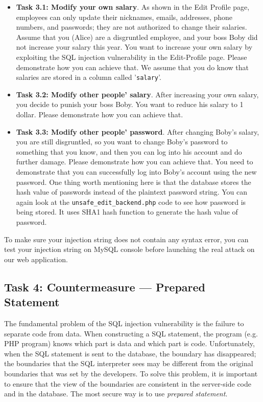 \begin{itemize}
\item {\bf Task 3.1: Modify your own salary}.  
As shown in the Edit Profile page,
employees can only update their nicknames, emails, addresses, phone numbers, and
passwords; they are not authorized to change their salaries.  
Assume that you (Alice) are a disgruntled employee, and your boss Boby did not 
increase your salary this year. You want to increase your own salary 
by exploiting the SQL injection vulnerability in
the Edit-Profile page. Please demonstrate how you can achieve that.
We assume that you do know that salaries are stored in 
a column called ’{\tt salary}’.


\item {\bf Task 3.2: Modify other people' salary}.
After increasing your own salary, you decide to punish your boss Boby. You want to reduce his
salary to 1 dollar. Please demonstrate how you can achieve that. 


\item {\bf Task 3.3: Modify other people' password}.
After changing Boby's salary, you are still disgruntled, so you
want to change Boby's password to something that you know, and then you can log into his account
and do further damage. Please demonstrate how you can achieve that.
You need to demonstrate that you can 
successfully log into Boby's account using the new
password.  One thing worth mentioning here is that the database stores the hash value of
passwords instead of the plaintext password string. You can again look at
the {\tt unsafe\_edit\_backend.php} code to see how password is being stored. It
uses SHA1 hash function to generate the hash value of password. 


\end{itemize}

To make sure your injection string does not contain any syntax error, 
you can test your injection string on MySQL console before launching the
real attack on our web application. 



\subsection{Task 4: Countermeasure --- Prepared Statement} 

The fundamental problem of the SQL injection vulnerability is the failure to
separate code from data. When constructing a SQL statement, the program
(e.g. PHP program) knows which part is data and which part is code.
Unfortunately, when the SQL statement is sent to the database, the boundary
has disappeared; the boundaries that the SQL interpreter sees may be
different from the original boundaries that was set by the developers.
To solve this problem, it is important to ensure that the view
of the boundaries are consistent in the server-side code and in the
database.  The most secure way is to use 
\textit{prepared statement}. 

